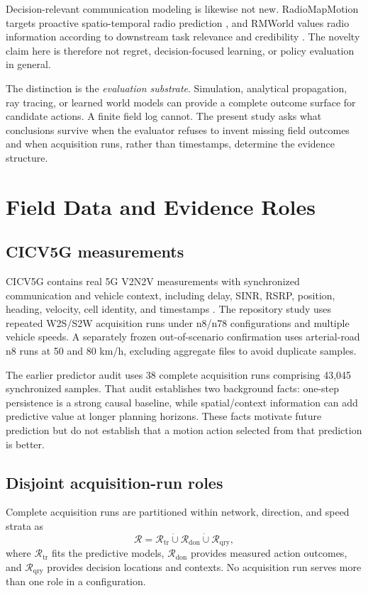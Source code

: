 \documentclass[journal]{IEEEtran}
\begin{document}
Decision-relevant communication modeling is likewise not new. RadioMapMotion targets proactive spatio-temporal radio prediction \cite{cheng2026}, and RMWorld values radio information according to downstream task relevance and credibility \cite{wang2026rmworld}. The novelty claim here is therefore not regret, decision-focused learning, or policy evaluation in general.

The distinction is the \emph{evaluation substrate}. Simulation, analytical propagation, ray tracing, or learned world models can provide a complete outcome surface for candidate actions. A finite field log cannot. The present study asks what conclusions survive when the evaluator refuses to invent missing field outcomes and when acquisition runs, rather than timestamps, determine the evidence structure.

\section{Field Data and Evidence Roles}
\subsection{CICV5G measurements}
CICV5G contains real 5G V2N2V measurements with synchronized communication and vehicle context, including delay, SINR, RSRP, position, heading, velocity, cell identity, and timestamps \cite{zhang2026}. The repository study uses repeated W2S/S2W acquisition runs under n8/n78 configurations and multiple vehicle speeds. A separately frozen out-of-scenario confirmation uses arterial-road n8 runs at 50 and 80 km/h, excluding aggregate files to avoid duplicate samples.

The earlier predictor audit uses 38 complete acquisition runs comprising 43,045 synchronized samples. That audit establishes two background facts: one-step persistence is a strong causal baseline, while spatial/context information can add predictive value at longer planning horizons. These facts motivate future prediction but do not establish that a motion action selected from that prediction is better.

\subsection{Disjoint acquisition-run roles}
Complete acquisition runs are partitioned within network, direction, and speed strata as
\begin{equation}
\mathcal R
=
\mathcal R_{\mathrm{tr}}
\dot\cup
\mathcal R_{\mathrm{don}}
\dot\cup
\mathcal R_{\mathrm{qry}},
\end{equation}
where $\mathcal R_{\mathrm{tr}}$ fits the predictive models, $\mathcal R_{\mathrm{don}}$ provides measured action outcomes, and $\mathcal R_{\mathrm{qry}}$ provides decision locations and contexts. No acquisition run serves more than one role in a configuration.
\end{document}
